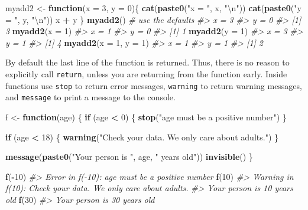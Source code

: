 \documentclass[]{book}
\newenvironment{Shaded}{\begin{snugshade}}{\end{snugshade}}
\newcommand{\KeywordTok}[1]{\textcolor[rgb]{0.13,0.29,0.53}{\textbf{#1}}}
\newcommand{\DataTypeTok}[1]{\textcolor[rgb]{0.13,0.29,0.53}{#1}}
\newcommand{\DecValTok}[1]{\textcolor[rgb]{0.00,0.00,0.81}{#1}}
\newcommand{\CharTok}[1]{\textcolor[rgb]{0.31,0.60,0.02}{#1}}
\newcommand{\StringTok}[1]{\textcolor[rgb]{0.31,0.60,0.02}{#1}}
\newcommand{\CommentTok}[1]{\textcolor[rgb]{0.56,0.35,0.01}{\textit{#1}}}
\newcommand{\ControlFlowTok}[1]{\textcolor[rgb]{0.13,0.29,0.53}{\textbf{#1}}}
\newcommand{\OperatorTok}[1]{\textcolor[rgb]{0.81,0.36,0.00}{\textbf{#1}}}
\newcommand{\NormalTok}[1]{#1}
\theoremstyle{definition}
\theoremstyle{definition}
\theoremstyle{definition}
\theoremstyle{remark}
\begin{document}
\begin{Shaded}
\begin{Highlighting}[]
\NormalTok{myadd2 <-}\StringTok{ }\ControlFlowTok{function}\NormalTok{(}\DataTypeTok{x =} \DecValTok{3}\NormalTok{, }\DataTypeTok{y =} \DecValTok{0}\NormalTok{)\{}
  \KeywordTok{cat}\NormalTok{(}\KeywordTok{paste0}\NormalTok{(}\StringTok{"x = "}\NormalTok{, x, }\StringTok{"}\CharTok{\textbackslash{}n}\StringTok{"}\NormalTok{))}
  \KeywordTok{cat}\NormalTok{(}\KeywordTok{paste0}\NormalTok{(}\StringTok{"y = "}\NormalTok{, y, }\StringTok{"}\CharTok{\textbackslash{}n}\StringTok{"}\NormalTok{))}
\NormalTok{  x }\OperatorTok{+}\StringTok{ }\NormalTok{y}
\NormalTok{\}}
\KeywordTok{myadd2}\NormalTok{()              }\CommentTok{# use the defaults}
\CommentTok{#> x = 3}
\CommentTok{#> y = 0}
\CommentTok{#> [1] 3}
\KeywordTok{myadd2}\NormalTok{(}\DataTypeTok{x =} \DecValTok{1}\NormalTok{)}
\CommentTok{#> x = 1}
\CommentTok{#> y = 0}
\CommentTok{#> [1] 1}
\KeywordTok{myadd2}\NormalTok{(}\DataTypeTok{y =} \DecValTok{1}\NormalTok{)}
\CommentTok{#> x = 3}
\CommentTok{#> y = 1}
\CommentTok{#> [1] 4}
\KeywordTok{myadd2}\NormalTok{(}\DataTypeTok{x =} \DecValTok{1}\NormalTok{, }\DataTypeTok{y =} \DecValTok{1}\NormalTok{)}
\CommentTok{#> x = 1}
\CommentTok{#> y = 1}
\CommentTok{#> [1] 2}
\end{Highlighting}
\end{Shaded}

By default the last line of the function is returned. Thus, there is no
reason to explicitly call \texttt{return}, unless you are returning from
the function early. Inside functions use \texttt{stop} to return error
messages, \texttt{warning} to return warning messages, and
\texttt{message} to print a message to the console.

\begin{Shaded}
\begin{Highlighting}[]
\NormalTok{f <-}\StringTok{ }\ControlFlowTok{function}\NormalTok{(age) \{}
  \ControlFlowTok{if}\NormalTok{ (age }\OperatorTok{<}\StringTok{ }\DecValTok{0}\NormalTok{) \{}
    \KeywordTok{stop}\NormalTok{(}\StringTok{"age must be a positive number"}\NormalTok{)}
\NormalTok{  \}}
  
  \ControlFlowTok{if}\NormalTok{ (age }\OperatorTok{<}\StringTok{ }\DecValTok{18}\NormalTok{) \{}
    \KeywordTok{warning}\NormalTok{(}\StringTok{"Check your data.  We only care about adults."}\NormalTok{)}
\NormalTok{  \}}
  
  \KeywordTok{message}\NormalTok{(}\KeywordTok{paste0}\NormalTok{(}\StringTok{"Your person is "}\NormalTok{, age, }\StringTok{" years old"}\NormalTok{))}
  \KeywordTok{invisible}\NormalTok{()}
\NormalTok{\}}

\KeywordTok{f}\NormalTok{(}\OperatorTok{-}\DecValTok{10}\NormalTok{)}
\CommentTok{#> Error in f(-10): age must be a positive number}
\KeywordTok{f}\NormalTok{(}\DecValTok{10}\NormalTok{)}
\CommentTok{#> Warning in f(10): Check your data. We only care about adults.}
\CommentTok{#> Your person is 10 years old}
\KeywordTok{f}\NormalTok{(}\DecValTok{30}\NormalTok{)}
\CommentTok{#> Your person is 30 years old}
\end{Highlighting}
\end{Shaded}
\end{document}
